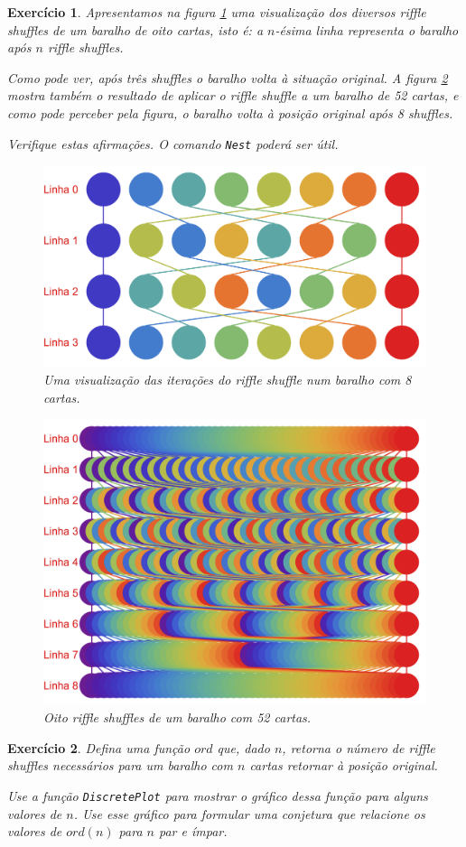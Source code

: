 \documentclass{article}
\newtheorem{ex}{Exercício}[section]
\begin{document}
\begin{ex}
Apresentamos na figura \ref{shuffle8} uma visualização dos diversos riffle shuffles de um baralho de oito cartas, isto é: a $n$-ésima linha representa o baralho após $n$ riffle shuffles.

Como pode ver, após três shuffles o baralho volta à situação original. A figura \ref{shuffle52} mostra também o resultado de aplicar o riffle shuffle a um baralho de 52 cartas, e como pode perceber pela figura, o baralho volta à posição original após 8 shuffles.

Verifique estas afirmações. O comando \texttt{Nest} poderá ser útil.

\begin{figure}[H]
\centering
\includegraphics[width=.75\textwidth]{shuffle8}
\caption{Uma visualização das iterações do riffle shuffle num baralho com 8 cartas.}\label{shuffle8}
\end{figure}

\begin{figure}[H]
\centering
\includegraphics[width=.75\textwidth]{shuffle52}
\caption{Oito riffle shuffles de um baralho com 52 cartas.}\label{shuffle52}
\end{figure}
\end{ex}

\begin{ex}
Defina uma função $ord$ que, dado $n$, retorna o número de riffle shuffles necessários para um baralho com $n$ cartas retornar à posição original.

Use a função \texttt{DiscretePlot} para mostrar o gráfico dessa função para alguns valores de $n$. Use esse gráfico para formular uma conjetura que relacione os valores de $ord(n)$ para $n$ par e ímpar.
\end{ex}
\end{document}
